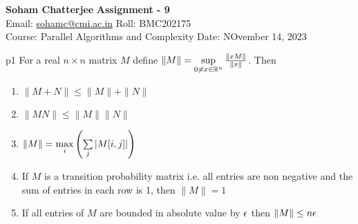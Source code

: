 \documentclass[a4paper, 11pt]{article}
\begin{document}
	
	
\textsf{\noindent \large\textbf{Soham Chatterjee} \hfill \textbf{Assignment - 9}\\
	Email: \href{sohamc@cmi.ac.in}{sohamc@cmi.ac.in} \hfill Roll: BMC202175\\
	\normalsize Course: Parallel Algorithms and Complexity \hfill Date: NOvember 14, 2023}
	
	
\begin{problem}{%
	}{p1%
	}
For a real $n\times n$ matrix $M$ define $\|M\|=\sup\limits_{0\neq x\in \mathbb{R}^n}\frac{\|xM\|}{\|x\|}$. Then
\begin{enumerate}
	\item $\|M+N\|\leq \|M\|+\|N\|$
	\item $\|MN\|\leq \|M\| \|N\|$
	\item $\|M\|=\max\limits_i\left(\sum\limits_j|M[i,j]|\right)$
	\item If $M$ is a transition probability matrix i.e. all entries are non negative and the sum of entries in each row is 1, then $\|M\|=1$
	\item If all entries of $M$ are bounded in absolute value by $\epsilon$ then $\|M\|\leq n\epsilon$
\end{enumerate}
		
\end{problem}
	
\end{document}
